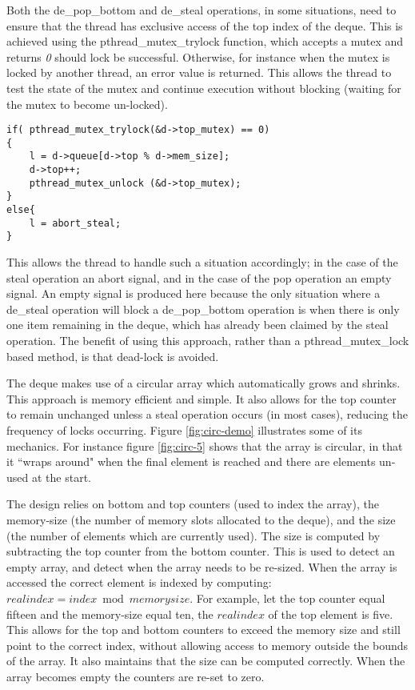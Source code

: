 Both the de\_pop\_bottom and de\_steal operations, in some situations, need to ensure that the thread has exclusive access of the 
top index of the deque.
This is achieved using the pthread\_mutex\_trylock function, which accepts a mutex and returns \textit{0} should lock be successful.
Otherwise, for instance when the mutex is locked by another thread, an error value is returned. This allows the thread to test the 
state of the mutex and continue execution without blocking (waiting for the mutex to become un-locked).

\begin{lstlisting}[label=li:destrealtrylock,
caption=This excerpt taken from the code for the de\_steal operation shows how the pthread\_mutex\_trylock funciton is used to avoid blocking when the mutex is already locked. If the function returns \(0\) the mutex is available otherwise the else clause is taken.]
if( pthread_mutex_trylock(&d->top_mutex) == 0)
{
    l = d->queue[d->top % d->mem_size];
    d->top++;
    pthread_mutex_unlock (&d->top_mutex);
}
else{
    l = abort_steal;
}
\end{lstlisting}

This allows the thread to handle such a situation accordingly; in the case of the steal operation an abort signal, and in the case
of the pop operation an empty signal. An empty signal is produced here because the only situation where a de\_steal operation will block 
a de\_pop\_bottom operation is when there is only one item remaining in the deque, which has already been claimed by the steal operation.
The benefit of using this approach, rather than a pthread\_mutex\_lock based method, is that \gls{dead-lock} is avoided.



The deque makes use of a \gls{circular array} which automatically grows and shrinks.
This approach is memory efficient and simple. 
It also allows for the top counter to remain unchanged unless a steal operation occurs (in most cases), reducing the frequency of locks occurring.
Figure \ref{fig:circ-demo} illustrates some of its mechanics. For instance figure \ref{fig:circ-5} shows that the array is circular, in that it
``wraps around" when the final element is reached and there are elements un-used at the start.

The design relies on bottom and top counters (used to index the array), the memory-size (the number of memory slots allocated to the deque), and 
the size (the number of elements which are currently used). The size is computed by subtracting the top counter from the bottom counter. 
This is used to detect an empty array, and detect when the array needs to be re-sized.
When the array is accessed the correct element is indexed by computing: \(realindex = index \bmod memorysize \). 
For example, let the top counter equal fifteen and the memory-size equal ten, the \(realindex\) of the top element is five.
This allows for the top and bottom counters to exceed the memory size and still point to the correct index, without allowing access to memory outside the 
bounds of the array. It also maintains that the size can be computed correctly. When the array becomes empty the counters are re-set to zero.


